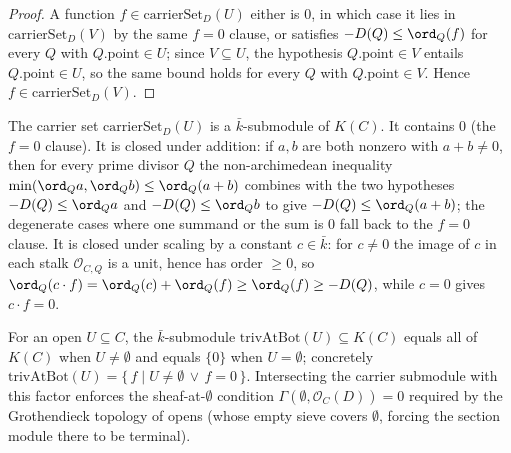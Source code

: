 \begin{proof}
  \leanok
  A function \(f \in \mathrm{carrierSet}_D(U)\) either is \(0\), in which
  case it lies in \(\mathrm{carrierSet}_D(V)\) by the same \(f = 0\) clause,
  or satisfies \(-D(Q) \le \ord_Q(f)\) for every \(Q\) with
  \(Q.\mathrm{point} \in U\); since \(V \subseteq U\), the hypothesis
  \(Q.\mathrm{point} \in V\) entails \(Q.\mathrm{point} \in U\), so the same
  bound holds for every \(Q\) with \(Q.\mathrm{point} \in V\). Hence
  \(f \in \mathrm{carrierSet}_D(V)\).
\end{proof}

\begin{definition}

  \label{def:sheafOf_carrierSubmodule}
  The carrier set \(\mathrm{carrierSet}_D(U)\) is a \(\bar k\)-submodule of
  \(K(C)\). It contains \(0\) (the \(f = 0\) clause). It is closed under
  addition: if \(a, b\) are both nonzero with \(a + b \neq 0\), then for
  every prime divisor \(Q\) the non-archimedean inequality
  \(\min(\ord_Q a, \ord_Q b) \le \ord_Q(a + b)\) combines with the two hypotheses
  \(-D(Q) \le \ord_Q a\) and \(-D(Q) \le \ord_Q b\) to give
  \(-D(Q) \le \ord_Q(a + b)\); the degenerate cases where one summand or the
  sum is \(0\) fall back to the \(f = 0\) clause. It is closed under scaling
  by a constant \(c \in \bar k\): for \(c \neq 0\) the image of \(c\) in
  each stalk \(\mathcal O_{C, Q}\) is a unit, hence has order \(\ge 0\), so
  \(\ord_Q(c \cdot f) = \ord_Q(c) + \ord_Q(f) \ge \ord_Q(f) \ge -D(Q)\),
  while \(c = 0\) gives \(c \cdot f = 0\).
\end{definition}

\begin{definition}

  \label{def:sheafOf_trivAtBot}
  For an open \(U \subseteq C\), the \(\bar k\)-submodule
  \(\mathrm{trivAtBot}(U) \subseteq K(C)\) equals all of \(K(C)\) when
  \(U \ne \emptyset\) and equals \(\{0\}\) when \(U = \emptyset\); concretely
  \(\mathrm{trivAtBot}(U) = \{\, f \mid U \ne \emptyset \,\lor\, f = 0\,\}\).
  Intersecting the carrier submodule with this factor enforces the
  sheaf-at-\(\emptyset\) condition \(\Gamma(\emptyset, \mathcal O_C(D)) = 0\)
  required by the Grothendieck topology of opens (whose empty sieve covers
  \(\emptyset\), forcing the section module there to be terminal).
\end{definition}

